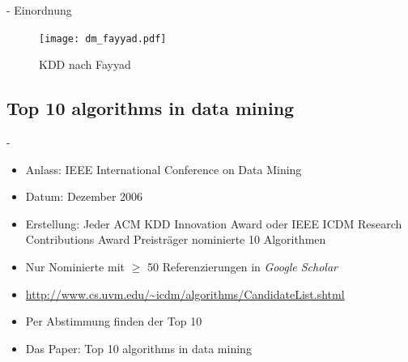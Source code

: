 \documentclass[fleqn,11pt,aspectratio=43]{beamer}
\begin{document}
\begin{frame}{\insertsectionhead - Einordnung}
\begin{figure}
\texttt{[image: dm\_fayyad.pdf]}
\caption{KDD nach Fayyad\cite{fayyad1996data}}
\label{fig:fayyad1996data}
\end{figure}
\end{frame}

%


\subsection{Top 10 algorithms in data mining}
\begin{frame}{\insertsectionhead - \insertsubsectionhead\cite{wu2008top}}
\begin{itemize}
\item Anlass: IEEE International Conference on Data Mining
\item Datum: Dezember 2006
\item Erstellung: Jeder ACM KDD Innovation Award oder IEEE ICDM Research 
Contributions Award Preisträger nominierte 10 Algorithmen
\item Nur Nominierte mit $\geq$ 50 Referenzierungen in \emph{Google Scholar}
\item 
{\small\url{http://www.cs.uvm.edu/~icdm/algorithms/CandidateList.shtml}}
\item Per Abstimmung finden der Top 10
\item Das Paper: Top 10 algorithms in data mining \cite{wu2008top}
\end{itemize}
\end{frame}
\end{document}
